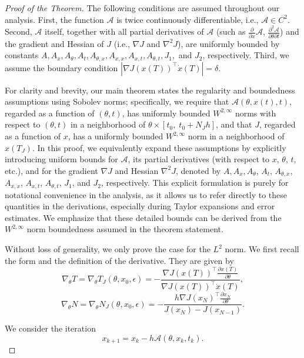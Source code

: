 \documentclass{article}
\begin{document}
\begin{proof}[Proof of the Theorem]
    The following conditions are assumed throughout our analysis. First, the function $\mathcal{A}$ is twice continuously differentiable, i.e., $\mathcal{A} \in C^2$. Second, $\mathcal{A}$ itself, together with all partial derivatives of $\mathcal{A}$ (such as $\frac{\partial}{\partial x}\mathcal{A}$, $\frac{\partial^2\mathcal{A}}{\partial \theta\partial t}$) and the gradient and Hessian of $J$ (i.e., $\nabla J$ and $\nabla^2 J$), are uniformly bounded by constants $A, A_x, A_{\theta}, A_t, A_{\theta,x}, A_{x,x}, A_{x,t}, A_{\theta,t}, J_1,$ and $J_2$, respectively. Third, we assume the boundary condition $|\nabla J(x(T))^\top\dot{x}(T)| = \delta$.
    
    For clarity and brevity, our main theorem states the regularity and boundedness assumptions using Sobolev norms; specifically, we require that $\mathcal{A}(\theta,x(t),t)$, regarded as a function of $(\theta, t)$, has uniformly bounded $W^{2,\infty}$ norms with respect to $(\theta, t)$ in a neighborhood of $\theta \times [t_0,\; t_0 + N_J h]$, and that $J$, regarded as a function of $x$, has a uniformly bounded $W^{2,\infty}$ norm in a neighborhood of $x(T_J)$. In this proof, we equivalently expand these assumptions by explicitly introducing uniform bounds for $\mathcal{A}$, its partial derivatives (with respect to $x$, $\theta$, $t$, etc.), and for the gradient $\nabla J$ and Hessian $\nabla^2 J$, denoted by $A, A_x, A_{\theta}$, $A_t$, $A_{\theta,x}$, $A_{x,x}$, $A_{x,t}$, $A_{\theta,t}$, $J_1$, and $J_2$, respectively. This explicit formulation is purely for notational convenience in the analysis, as it allows us to refer directly to these quantities in the derivations, especially during Taylor expansions and error estimates. We emphasize that these detailed bounds can be derived from the $W^{2,\infty}$ norm boundedness assumed in the theorem statement.
    
    Without loss of generality, we only prove the case for the $L^2$ norm. We first recall the form and the definition of the derivative. They are given by
    \[
    \nabla_{\theta} T = \nabla_{\theta}T_J(\theta,x_0,\epsilon)=
    -\frac{\nabla J(x(T))^\top\frac{\partial x(T)}{\partial \theta}}{\nabla J(x(T))^\top\dot{x}(T)},
    \]\[
    \nabla_{\theta}N=
    \nabla_{\theta}N_J(\theta,x_0,\epsilon)=
    -\frac{h\nabla J(x_N)^\top\frac{\partial x_N}{\partial \theta}}{J(x_N)-J(x_{N-1})}.
    \]

    We consider the iteration 
    \[
    x_{k+1} = x_k - h\mathcal{A}(\theta,x_k,t_k).
    \]


\end{proof}
\end{document}
